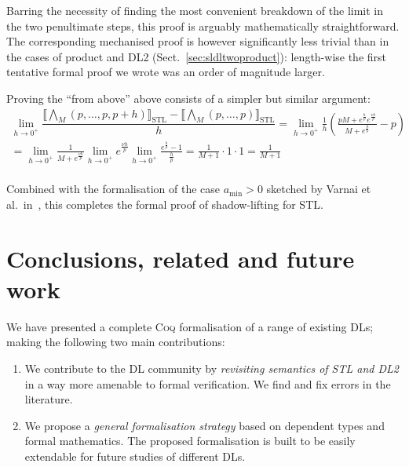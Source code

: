 \documentclass[a4paper,UKenglish,cleveref, autoref, thm-restate]{lipics-v2021}
\newcommand{\naryConj}{\bigwedge\nolimits_M}
\def\DLtwo{\textrm{DL2}}
\def\STL{\textrm{STL}}
\def\product{\textrm{product}}
\newcommand{\tSTL}[1]{\llbracket #1 \rrbracket_{\STL}}
\newcommand{\pval}{p}
\def\coq{\textsc{Coq}}
\begin{document}
Barring the necessity of finding the most convenient breakdown of the
limit in the two penultimate steps, this proof is arguably
mathematically straightforward.  The corresponding mechanised proof is
however significantly less trivial than in the cases of \product{} and
\DLtwo{} (Sect.~\ref{sec:sldltwoproduct}): length-wise the first
tentative formal proof we wrote was an order of magnitude larger.

Proving the ``from above'' above consists of a simpler but similar
argument:
\begin{multline*}
\lim\limits_{h \rightarrow 0^+} \dfrac{\tSTL{\naryConj(\pval, \ldots, \pval, 
		\pval + h)} - \tSTL{\naryConj(\pval, \ldots, \pval)}}{h}
= \lim\limits_{h \rightarrow 0^+}  \frac{1}{h} \left (\frac{\pval M + 		
e^{\frac{h}{\pval}} e^{\frac{\nu h}{\pval}}} {M + e^{\frac{h}{\pval}}} - p\right) \\
= \lim\limits_{h \rightarrow 0^+} \frac{1}{M + e^{\frac{\nu h}{\pval}}}
\lim\limits_{h \rightarrow 0^+} e^{\frac{\nu h}{\pval}}
\lim\limits_{h \rightarrow 0^+} \frac{ e^{\frac{ h}{\pval}} 
-1}{\frac{h}{\pval}}
= \frac{1}{M + 1} \cdot 1 \cdot 1 = \frac{1}{M + 1}\\
\end{multline*}

Combined with the formalisation of the case $a_{\min} > 0$
sketched by Varnai et al.\ in~\cite[Sect.~V]{varnai}, this completes
the formal proof of shadow-lifting for \STL{}.

\section{Conclusions, related and future work}
\label{sec:conclusion}

We have presented a complete \coq{} formalisation of a range of
existing DLs; making the following two main contributions:

\begin{enumerate}
\item We contribute to the DL community by {\em revisiting
    semantics of \STL{} and \DLtwo\/} in a way more amenable to formal
  verification. We find and fix errors in the literature.
\item We propose a {\em general formalisation strategy} based on
  dependent types and formal mathematics. The proposed
  formalisation is built to be easily extendable for future studies of
  different DLs.
\end{enumerate}
\end{document}
